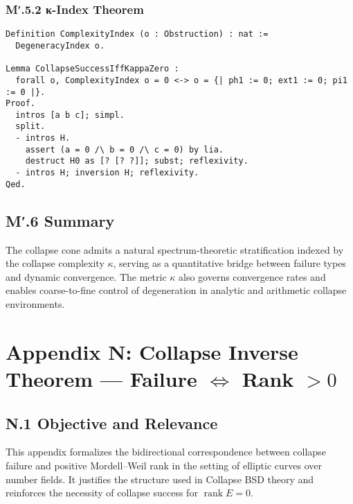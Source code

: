 \documentclass[11pt]{article}
\begin{document}
\subsubsection*{M′.5.2 κ-Index Theorem}

\begin{lstlisting}[language=Coq, caption=Collapse Complexity Index κ, captionpos=b]
Definition ComplexityIndex (o : Obstruction) : nat :=
  DegeneracyIndex o.

Lemma CollapseSuccessIffKappaZero :
  forall o, ComplexityIndex o = 0 <-> o = {| ph1 := 0; ext1 := 0; pi1 := 0 |}.
Proof.
  intros [a b c]; simpl.
  split.
  - intros H.
    assert (a = 0 /\ b = 0 /\ c = 0) by lia.
    destruct H0 as [? [? ?]]; subst; reflexivity.
  - intros H; inversion H; reflexivity.
Qed.
\end{lstlisting}

\subsection*{M′.6 Summary}

The collapse cone admits a natural spectrum-theoretic stratification indexed by the collapse complexity \( \kappa \), serving as a quantitative bridge between failure types and dynamic convergence. The metric \( \kappa \) also governs convergence rates and enables coarse-to-fine control of degeneration in analytic and arithmetic collapse environments.



\appendix
\section*{Appendix N: Collapse Inverse Theorem — Failure $\Leftrightarrow$ Rank $> 0$}

\subsection*{N.1 Objective and Relevance}

This appendix formalizes the bidirectional correspondence between collapse failure and positive Mordell–Weil rank in the setting of elliptic curves over number fields. It justifies the structure used in Collapse BSD theory and reinforces the necessity of collapse success for \( \operatorname{rank} E = 0 \).
\end{document}
